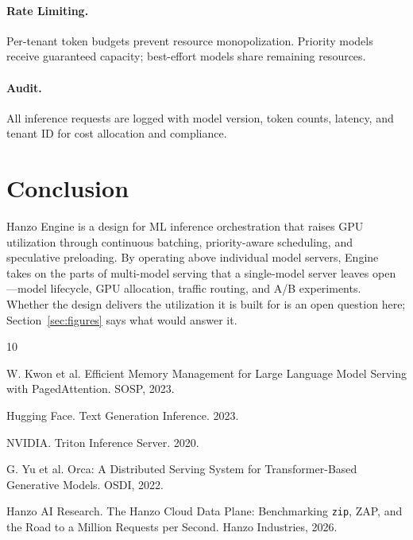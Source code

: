 \documentclass[11pt,twocolumn]{article}
\begin{document}
\paragraph{Rate Limiting.} Per-tenant token budgets prevent resource monopolization. Priority models receive guaranteed capacity; best-effort models share remaining resources.

\paragraph{Audit.} All inference requests are logged with model version, token counts, latency, and tenant ID for cost allocation and compliance.

\section{Conclusion}

Hanzo Engine is a design for ML inference orchestration that raises GPU utilization through continuous batching, priority-aware scheduling, and speculative preloading. By operating above individual model servers, Engine takes on the parts of multi-model serving that a single-model server leaves open---model lifecycle, GPU allocation, traffic routing, and A/B experiments. Whether the design delivers the utilization it is built for is an open question here; Section~\ref{sec:figures} says what would answer it.


\begin{thebibliography}{10}

W. Kwon et al. Efficient Memory Management for Large Language Model Serving with PagedAttention. SOSP, 2023.

Hugging Face. Text Generation Inference. 2023.

NVIDIA. Triton Inference Server. 2020.

G. Yu et al. Orca: A Distributed Serving System for Transformer-Based Generative Models. OSDI, 2022.

Hanzo AI Research. The Hanzo Cloud Data Plane: Benchmarking \texttt{zip}, ZAP, and the Road to a Million Requests per Second. Hanzo Industries, 2026.

\end{thebibliography}
\end{document}
